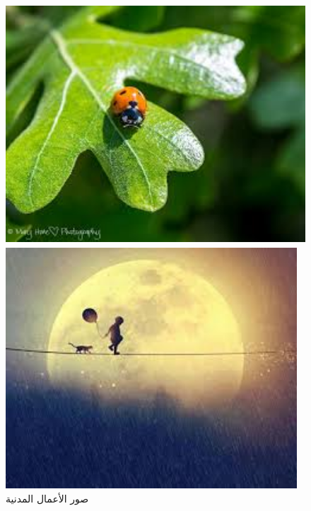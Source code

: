 \documentclass{article}
\begin{document}
\begin{figure}[H]
    \begin{minipage}{0.45\textwidth}
        \centering
        \includegraphics[height=9cm,width=\textwidth]{civil/3.jpg}
    \end{minipage}
    \hfill
    \begin{minipage}{0.45\textwidth}
        \centering
        \includegraphics[height=9cm,width=\textwidth]{civil/4.jpg}
    \end{minipage}
        \caption{صور الأعمال المدنية}
\end{figure}
\end{document}
